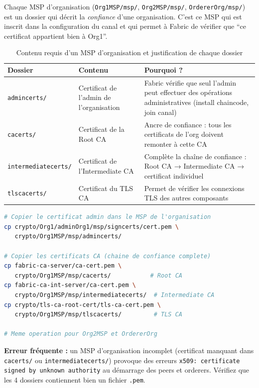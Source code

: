 \documentclass[12pt,a4paper,twoside]{report}
\begin{document}
Chaque MSP d'organisation (\texttt{Org1MSP/msp/}, \texttt{Org2MSP/msp/}, \texttt{OrdererOrg/msp/}) est un dossier qui décrit la \textit{confiance} d'une organisation. C'est ce MSP qui est inscrit dans la configuration du canal et qui permet à Fabric de vérifier que ``ce certificat appartient bien à Org1''.

\begin{table}[H]
\centering
\begin{tabularx}{\textwidth}{lXp{5cm}}
\toprule
\textbf{Dossier} & \textbf{Contenu} & \textbf{Pourquoi ?} \\
\midrule
\texttt{admincerts/} & Certificat de l'admin de l'organisation & Fabric vérifie que seul l'admin peut effectuer des opérations administratives (install chaincode, join canal) \\
\texttt{cacerts/} & Certificat de la Root CA & Ancre de confiance : tous les certificats de l'org doivent remonter à cette CA \\
\texttt{intermediatecerts/} & Certificat de l'Intermediate CA & Complète la chaîne de confiance : Root CA → Intermediate CA → certificat individuel \\
\texttt{tlscacerts/} & Certificat du TLS CA & Permet de vérifier les connexions TLS des autres composants \\
\bottomrule
\end{tabularx}
\caption{Contenu requis d'un MSP d'organisation et justification de chaque dossier}
\end{table}

\begin{lstlisting}[language=bash, caption=Population du MSP d'organisation (exemple Org1MSP)]
# Copier le certificat admin dans le MSP de l'organisation
cp crypto/Org1/adminOrg1/msp/signcerts/cert.pem \
   crypto/Org1MSP/msp/admincerts/

# Copier les certificats CA (chaine de confiance complete)
cp fabric-ca-server/ca-cert.pem \
   crypto/Org1MSP/msp/cacerts/           # Root CA
cp fabric-ca-int-server/ca-cert.pem \
   crypto/Org1MSP/msp/intermediatecerts/  # Intermediate CA
cp crypto/tls-ca-root-cert/tls-ca-cert.pem \
   crypto/Org1MSP/msp/tlscacerts/         # TLS CA

# Meme operation pour Org2MSP et OrdererOrg
\end{lstlisting}

\begin{dangerbox}
\textbf{Erreur fréquente :} un MSP d'organisation incomplet (certificat manquant dans \texttt{cacerts/} ou \texttt{intermediatecerts/}) provoque des erreurs \texttt{x509: certificate signed by unknown authority} au démarrage des peers et orderers. Vérifiez que les 4 dossiers contiennent bien un fichier \texttt{.pem}.
\end{dangerbox}
\end{document}
